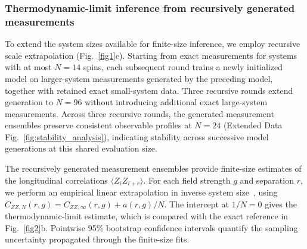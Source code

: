 \documentclass[pdflatex,sn-nature]{sn-jnl}%
\theoremstyle{thmstyleone}%
\theoremstyle{thmstyletwo}%
\theoremstyle{thmstylethree}%
\begin{document}



\subsubsection{Thermodynamic-limit inference from recursively generated measurements}

To extend the system sizes available for finite-size inference, we employ recursive scale extrapolation (Fig.~\ref{fig1}c). Starting from exact measurements for systems with at most $N=14$ spins, each subsequent round trains a newly initialized model on larger-system measurements generated by the preceding model, together with retained exact small-system data. Three recursive rounds extend generation to $N=96$ without introducing additional exact large-system measurements. Across three recursive rounds, the generated measurement ensembles preserve consistent observable profiles at $N=24$ (Extended Data Fig.~\ref{fig:stability_analysis}), indicating stability across successive model generations at this shared evaluation size.

The recursively generated measurement ensembles provide finite-size estimates of the longitudinal correlations $\langle Z_iZ_{i+r}\rangle$. For each field strength $g$ and separation $r$, we perform an empirical linear extrapolation in inverse system size~\cite{privman1990finite,cardy1996scaling}, using $C_{ZZ,N}(r,g)=C_{ZZ,\infty}(r,g)+a(r,g)/N$. The intercept at $1/N=0$ gives the thermodynamic-limit estimate, which is compared with the exact reference in Fig.~\ref{fig2}b. Pointwise 95\% bootstrap confidence intervals quantify the sampling uncertainty propagated through the finite-size fits.

\end{document}
